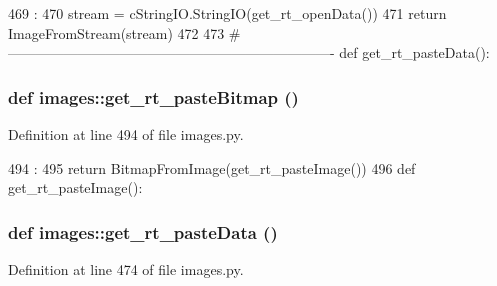 \begin{DoxyCode}
469                       :
470     stream = cStringIO.StringIO(get_rt_openData())
471     return ImageFromStream(stream)
472 
473 #----------------------------------------------------------------------
def get_rt_pasteData():
\end{DoxyCode}
\hypertarget{namespaceimages_a1fbbb8c3cb5e0cfc66917c859eda034a}{
\subsubsection[{get\_\-rt\_\-pasteBitmap}]{\setlength{\rightskip}{0pt plus 5cm}def images::get\_\-rt\_\-pasteBitmap ()}}
\label{namespaceimages_a1fbbb8c3cb5e0cfc66917c859eda034a}


Definition at line 494 of file images.py.


\begin{DoxyCode}
494                         :
495     return BitmapFromImage(get_rt_pasteImage())
496 
def get_rt_pasteImage():
\end{DoxyCode}
\hypertarget{namespaceimages_aa9b7314eecfda5eb25f1294b046e5d19}{
\subsubsection[{get\_\-rt\_\-pasteData}]{\setlength{\rightskip}{0pt plus 5cm}def images::get\_\-rt\_\-pasteData ()}}
\label{namespaceimages_aa9b7314eecfda5eb25f1294b046e5d19}


Definition at line 474 of file images.py.


